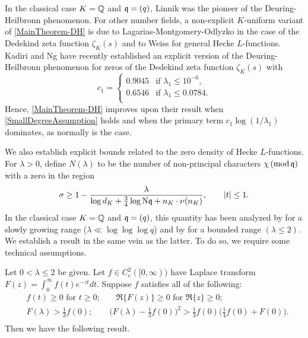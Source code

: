 \documentclass[12pt,psamsfonts]{amsart}
\theoremstyle{definition}
\theoremstyle{remark}
\numberwithin{equation}{section}
\begin{document}
In the classical case $K = \mathbb{Q}$ and $\mathfrak{q} = (q)$, Linnik \cite{Linnik2} was the pioneer of the Deuring-Heilbronn phenomenon. For other number fields,
a non-explicit $K$-uniform variant of \cref{MainTheorem-DH} is due to Lagarias-Montgomery-Odlyzko \cite{LMO} in the case of the Dedekind zeta function $\zeta_K(s)$ and to Weiss \cite{Weiss} for general Hecke $L$-functions. Kadiri and Ng \cite{KadNg} have recently established an explicit version of the Deuring-Heilbronn phenomenon for zeros of the Dedekind zeta function $\zeta_K(s)$ with 
\[
c_1 = \begin{cases}  
0.9045 & \text{if $\lambda_1 \leq 10^{-6}$}, \\
0.6546 & \text{if $\lambda_1 \leq 0.0784$}. \\ 
\end{cases}
\] 
Hence, \cref{MainTheorem-DH} improves upon their result when \eqref{SmallDegreeAssumption} holds and when the primary term $c_1 \log(1/\lambda_1)$ dominates, as normally is the case. 

We also establish explicit bounds related to the zero density of Hecke $L$-functions. For $\lambda > 0$, define $N(\lambda)$ to be the number of non-principal characters $\chi \, (\mathrm{mod} {\, \mathfrak{q}})$ with a zero in the region
\begin{equation}
\sigma \geq 1-\frac{\lambda}{\log d_K + \tfrac{3}{4}\log \mathrm{N}\mathfrak{q} + n_K \cdot \nu(n_K)}, \qquad |t| \leq 1. 
\label{MainTheorem-ZD-Region}
\end{equation}
In the classical case $K= \mathbb{Q}$ and $\mathfrak{q} = (q)$, this quantity has been analyzed by \cite{Graham,HBLinnik} for a slowly growing range ($\lambda \ll \log\log\log q$) and by \cite{HBLinnik} for a bounded range $(\lambda \leq 2)$. We establish a result in the same vein as the latter. To do so, we require some  technical assumptions.

Let $0 < \lambda \leq 2$ be given. Let $f \in C_c^2([0,\infty))$ have Laplace transform $F(z) = \int_0^{\infty} f(t) e^{-zt} dt$. Suppose $f$ satisfies all of the following:
\begin{equation}
\begin{aligned}
& f(t) \geq 0 \text{ for $t \geq 0$;} \qquad  \Re\{ F(z) \} \geq 0 \text{ for $\Re\{z\} \geq 0;$} \\
& F(\lambda) > \tfrac{1}{3}f(0); \qquad \Big( F(\lambda) - \tfrac{1}{3}f(0) \Big)^2 > \tfrac{1}{3}f(0)\Big(\tfrac{1}{4}f(0) + F(0) \Big). \\
\end{aligned}
\label{MainTheorem-ZD-Condition}
\end{equation}
Then we have the following result. 
\end{document}
